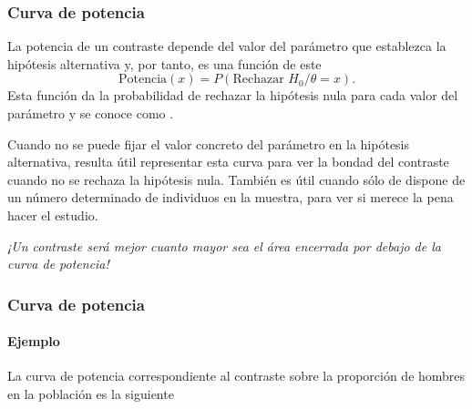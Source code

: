 \begin{frame}
\frametitle{Curva de potencia}
La potencia de un contraste depende del valor del parámetro que establezca la hipótesis alternativa y, por tanto, es una
función de este
\[
\text{Potencia}(x)= P(\text{Rechazar }H_0/\theta=x).
\]
Esta función da la probabilidad de rechazar la hipótesis nula para cada valor del parámetro y se conoce como
.

Cuando no se puede fijar el valor concreto del parámetro en la hipótesis alternativa, resulta útil representar esta
curva para ver la bondad del contraste cuando no se rechaza la hipótesis nula. También es útil cuando sólo de dispone
de un número determinado de individuos en la muestra, para ver si merece la pena hacer el estudio.
\begin{center}
\alert{\emph{¡Un contraste será mejor cuanto mayor sea el área encerrada por debajo de la curva de potencia!}}
\end{center}
\end{frame}


\begin{frame}
\frametitle{Curva de potencia}
\framesubtitle{Ejemplo}
La curva de potencia correspondiente al contraste sobre la proporción de hombres en la población es la siguiente
\begin{center}
\scalebox{0.68}{}
\end{center}
\end{frame}


